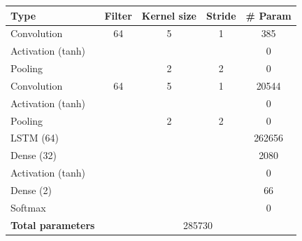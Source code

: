 \documentclass[10pt,twocolumn,letterpaper]{article}
\begin{document}
\begin{appendices}
\begin{tabular}{|l|c|c|c|c|}
   \hline
   Type                & Filter & Kernel size & Stride & \# Param \\ \hline
   Convolution         & 64     & 5           & 1      & 385      \\ \hline
   Activation (tanh)   &        &             &        & 0        \\ \hline
   Pooling             &        & 2           & 2      & 0        \\ \hline
   Convolution         & 64     & 5           & 1      & 20544    \\ \hline
   Activation (tanh)   &        &             &        & 0        \\ \hline
   Pooling             &        & 2           & 2      & 0        \\ \hline
   LSTM (64)           &        &             &        & 262656   \\ \hline
   Dense (32)          &        &             &        & 2080     \\ \hline
   Activation (tanh)   &        &             &        & 0        \\ \hline
   Dense (2)           &        &             &        & 66       \\ \hline
   Softmax             &        &             &        & 0        \\ \hline
   \textbf{Total parameters} & \multicolumn{4}{c|}{285730} \\ \hline
   \end{tabular}

\end{appendices}
\end{document}
